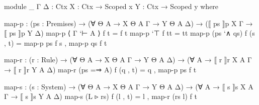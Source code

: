 \begin{code}
  module _ {Γ Δ : Ctx} {X : Ctx → Scoped x} {Y : Ctx → Scoped y} where

    map-p : (ps : Premises) →
            (∀ {Θ A} → X Θ A Γ → Y Θ A Δ) →
            (⟦ ps ⟧p X Γ → ⟦ ps ⟧p Y Δ)
    map-p ⟨ Γ `⊢ A ⟩ f t = f t
    map-p `⊤ f tt = tt
    map-p (ps `∧ qs) f (s , t) = map-p ps f s , map-p qs f t

    map-r : (r : Rule) →
            (∀ {Θ A} → X Θ A Γ → Y Θ A Δ) →
            (∀ {A} → ⟦ r ⟧r X A Γ → ⟦ r ⟧r Y A Δ)
    map-r (ps =⇒ A) f (q , t) = q , map-p ps f t

    map-s : (s : System) →
            (∀ {Θ A} → X Θ A Γ → Y Θ A Δ) →
            (∀ {A} → ⟦ s ⟧s X A Γ → ⟦ s ⟧s Y A Δ)
    map-s (L ▹ rs) f (l , t) = l , map-r (rs l) f t
\end{code}
